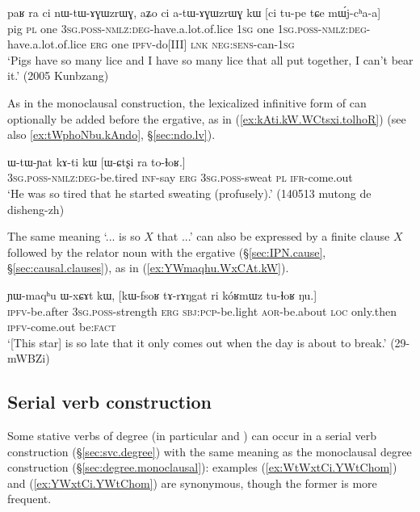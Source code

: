 \begin{exe}
\ex \label{ex:atAGWzrWG.kW}
\gll paʁ ra ci nɯ-tɯ-ɤɣɯzrɯɣ, aʑo ci a-tɯ-ɤɣɯzrɯɣ kɯ [ci tu-pe tɕe mɯ́j-cʰa-a] \\
pig \textsc{pl} one \textsc{3sg}.\textsc{poss}-\textsc{nmlz}:\textsc{deg}-have.a.lot.of.lice \textsc{1sg} one \textsc{1sg}.\textsc{poss}-\textsc{nmlz}:\textsc{deg}-have.a.lot.of.lice \textsc{erg} one \textsc{ipfv}-do[III] \textsc{lnk} \textsc{neg}:\textsc{sens}-can-\textsc{1sg} \\
\glt `Pigs have so many lice and I have so many lice that all put together, I can't bear it.' (2005 Kunbzang)
\end{exe}

As in the monoclausal construction, the lexicalized infinitive form  of  can optionally be added before the ergative, as in (\ref{ex:kAti.kW.WCtsxi.tolhoR}) (see also \ref{ex:tWphoNbu.kAndo}, §\ref{sec:ndo.lv}).
 
 
\begin{exe}
\ex \label{ex:kAti.kW.WCtsxi.tolhoR}
\gll ɯ-tɯ-ɲat kɤ-ti kɯ [ɯ-ɕtʂi ra to-ɬoʁ.] \\
\textsc{3sg}.\textsc{poss}-\textsc{nmlz}:\textsc{deg}-be.tired \textsc{inf}-say \textsc{erg} \textsc{3sg}.\textsc{poss}-sweat \textsc{pl} \textsc{ifr}-come.out \\
\glt `He was so tired that he started sweating (profusely).' (140513 mutong de disheng-zh)
\end{exe}

The same meaning `... is so $X$ that ...' can also be expressed by a finite clause $X$ followed by the relator noun  with the ergative  (§\ref{sec:IPN.cause}, §\ref{sec:causal.clauses}), as in (\ref{ex:YWmaqhu.WxCAt.kW}). 


\largerpage
\begin{exe}
\ex \label{ex:YWmaqhu.WxCAt.kW}
\gll ɲɯ-maqʰu ɯ-xɕɤt kɯ, [kɯ-fsoʁ tɤ-rɤŋgat ri kóʁmɯz tu-ɬoʁ ŋu.] \\
\textsc{ipfv}-be.after \textsc{3sg}.\textsc{poss}-strength \textsc{erg} \textsc{sbj}:\textsc{pcp}-be.light \textsc{aor}-be.about \textsc{loc} only.then \textsc{ipfv}-come.out be:\textsc{fact} \\
\glt `[This star] is so late that it only comes out when the day is about to break.' (29-mWBZi)
\end{exe}


\subsection{Serial verb construction} \label{sec:degree.svc}
Some stative verbs of degree (in particular  and ) can occur in a serial verb construction (§\ref{sec:svc.degree}) with the same meaning as the monoclausal degree construction (§\ref{sec:degree.monoclausal}): examples (\ref{ex:WtWxtCi.YWtChom}) and (\ref{ex:YWxtCi.YWtChom}) are synonymous, though the former is more frequent.

